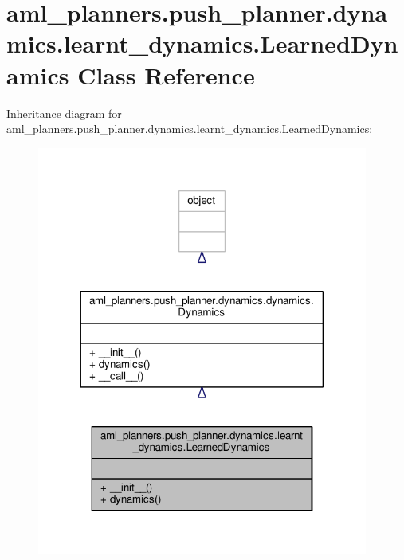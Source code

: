 \hypertarget{classaml__planners_1_1push__planner_1_1dynamics_1_1learnt__dynamics_1_1_learned_dynamics}{\section{aml\-\_\-planners.\-push\-\_\-planner.\-dynamics.\-learnt\-\_\-dynamics.\-Learned\-Dynamics Class Reference}
\label{classaml__planners_1_1push__planner_1_1dynamics_1_1learnt__dynamics_1_1_learned_dynamics}
}


Inheritance diagram for aml\-\_\-planners.\-push\-\_\-planner.\-dynamics.\-learnt\-\_\-dynamics.\-Learned\-Dynamics\-:\nopagebreak
\begin{figure}[H]
\begin{center}
\leavevmode
\includegraphics[width=308pt]{classaml__planners_1_1push__planner_1_1dynamics_1_1learnt__dynamics_1_1_learned_dynamics__inherit__graph}
\end{center}
\end{figure}


